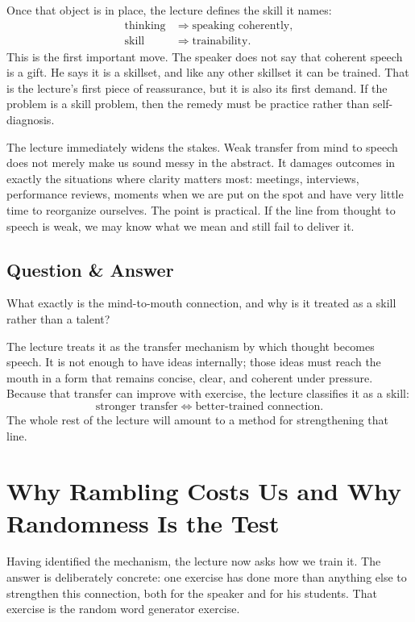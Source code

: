 Once that object is in place, the lecture defines the skill it names:
\begin{align}
\text{thinking} &\Longrightarrow \text{speaking coherently},\\
\text{skill} &\Longrightarrow \text{trainability}.
\end{align}
This is the first important move. The speaker does not say that coherent speech is a gift. He says it is a skillset, and like any other skillset it can be trained. That is the lecture's first piece of reassurance, but it is also its first demand. If the problem is a skill problem, then the remedy must be practice rather than self-diagnosis.

The lecture immediately widens the stakes. Weak transfer from mind to speech does not merely make us sound messy in the abstract. It damages outcomes in exactly the situations where clarity matters most: meetings, interviews, performance reviews, moments when we are put on the spot and have very little time to reorganize ourselves. The point is practical. If the line from thought to speech is weak, we may know what we mean and still fail to deliver it.

\subsection{Question \& Answer}

What exactly is the mind-to-mouth connection, and why is it treated as a skill rather than a talent?

The lecture treats it as the transfer mechanism by which thought becomes speech. It is not enough to have ideas internally; those ideas must reach the mouth in a form that remains concise, clear, and coherent under pressure. Because that transfer can improve with exercise, the lecture classifies it as a skill:
\begin{equation}
\text{stronger transfer} \Longleftrightarrow \text{better-trained connection}.
\end{equation}
The whole rest of the lecture will amount to a method for strengthening that line.

\section{Why Rambling Costs Us and Why Randomness Is the Test}

Having identified the mechanism, the lecture now asks how we train it. The answer is deliberately concrete: one exercise has done more than anything else to strengthen this connection, both for the speaker and for his students. That exercise is the random word generator exercise.


